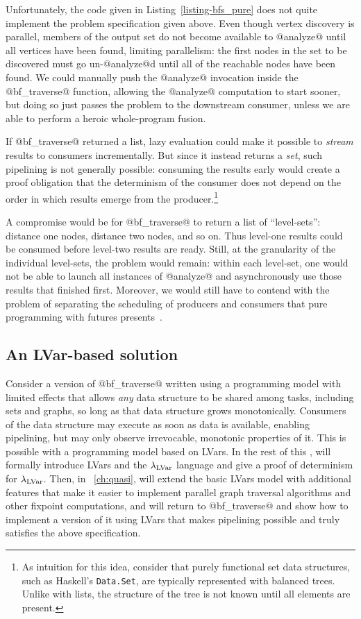 Unfortunately, the code given in Listing~\ref{listing-bfs_pure} does
not quite implement the problem specification given above.  Even
though vertex discovery is parallel, members of the
output set do not become available to @analyze@ until all vertices have been found,
limiting parallelism: the first nodes in
the set to be discovered must go un-@analyze@d until
all of the reachable nodes have been found.  We
could manually push the @analyze@ invocation inside the @bf_traverse@
function, allowing the @analyze@ computation to start sooner, but
doing so just passes the problem to the downstream consumer, unless we
are able to perform a heroic whole-program fusion.

If @bf_traverse@ returned a list, lazy evaluation could make it
possible to \emph{stream} results to consumers incrementally.  But
since it instead returns a \emph{set}, such pipelining is not
generally possible: consuming the results early would create a proof
obligation that the determinism of the consumer does not depend on the
order in which results emerge from the producer.\footnote{As intuition
  for this idea, consider that purely functional set data structures,
  such as Haskell's \lstinline|Data.Set|, are typically represented
  with balanced trees.  Unlike with lists, the structure of the tree
  is not known until all elements are present.}

A compromise would be for @bf_traverse@ to return a list of
``level-sets'': distance one nodes, distance two nodes, and so on.
Thus level-one results could be consumed before level-two results are
ready.  Still, at the granularity of the individual level-sets, the
problem would remain: within each level-set, one would not be able to
launch all instances of @analyze@ and asynchronously use those results
that finished first.  Moreover, we would still have to contend with
the problem of separating the scheduling of producers and consumers
that pure programming with futures presents~\cite{monad-par}.

\subsection{An LVar-based solution}

Consider a version of @bf_traverse@ written using a programming model
with limited effects that allows \emph{any} data structure to be
shared among tasks, including sets and graphs, so long as that data
structure grows monotonically.  Consumers of the data structure may
execute as soon as data is available, enabling pipelining, but may
only observe irrevocable, monotonic properties of it. This is possible
with a programming model based on LVars.  In the rest of this ,
 will formally introduce LVars and the $\lambda_{\textrm{LVar}}$ language and
give a proof of determinism for $\lambda_{\textrm{LVar}}$.  Then, in
~\ref{ch:quasi},  will extend the basic LVars model with
additional features that make it easier to implement parallel graph
traversal algorithms and other fixpoint computations, and  will
return to @bf_traverse@ and show how to implement a version of it
using LVars that makes pipelining possible and truly satisfies the
above specification.
